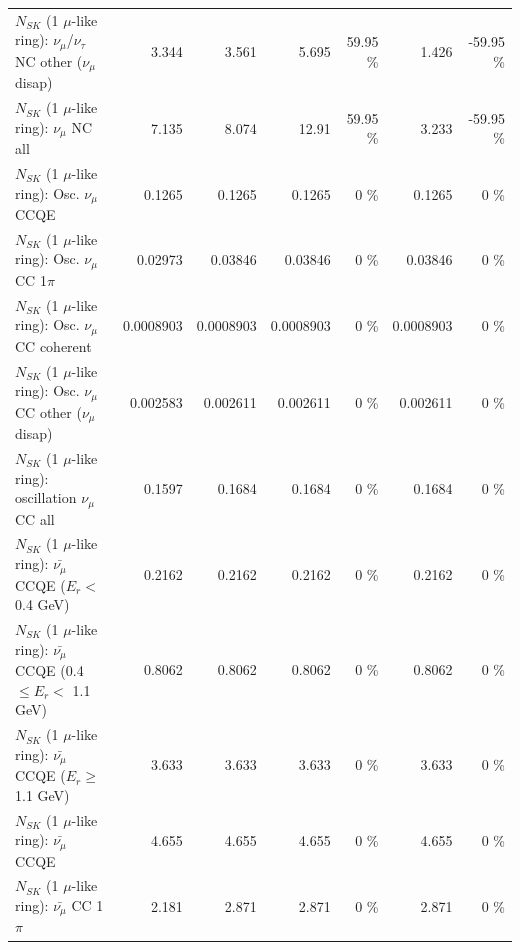 \begin{table}
\begin{tabular}{| l | r | r | r  r | r  r |}
   $N_{SK}$ (1 $\mu$-like ring): $\nu_\mu$/$\nu_\tau$ NC other ($\nu_\mu$ disap) &           3.344 &           3.561 &           5.695 &    59.95 \%  &           1.426 &   -59.95 \%  \\ 
                                $N_{SK}$ (1 $\mu$-like ring): $\nu_{\mu}$ NC all &           7.135 &           8.074 &           12.91 &    59.95 \%  &           3.233 &   -59.95 \%  \\ 
\hline
\hline
                               $N_{SK}$ (1 $\mu$-like ring): Osc. $\nu_\mu$ CCQE &          0.1265 &          0.1265 &          0.1265 &        0 \%  &          0.1265 &        0 \%  \\ 
                          $N_{SK}$ (1 $\mu$-like ring): Osc. $\nu_\mu$ CC 1$\pi$ &         0.02973 &         0.03846 &         0.03846 &        0 \%  &         0.03846 &        0 \%  \\ 
                        $N_{SK}$ (1 $\mu$-like ring): Osc. $\nu_\mu$ CC coherent &       0.0008903 &       0.0008903 &       0.0008903 &        0 \%  &       0.0008903 &        0 \%  \\ 
         $N_{SK}$ (1 $\mu$-like ring): Osc. $\nu_\mu$ CC other ($\nu_\mu$ disap) &        0.002583 &        0.002611 &        0.002611 &        0 \%  &        0.002611 &        0 \%  \\ 
                      $N_{SK}$ (1 $\mu$-like ring): oscillation $\nu_\mu$ CC all &          0.1597 &          0.1684 &          0.1684 &        0 \%  &          0.1684 &        0 \%  \\ 
\hline
\hline
          $N_{SK}$ (1 $\mu$-like ring): $\bar{\nu_\mu}$ CCQE ($E_{r} <$ 0.4 GeV) &          0.2162 &          0.2162 &          0.2162 &        0 \%  &          0.2162 &        0 \%  \\ 
 $N_{SK}$ (1 $\mu$-like ring): $\bar{\nu_\mu}$ CCQE (0.4 $\leq E_{r} <$ 1.1 GeV) &          0.8062 &          0.8062 &          0.8062 &        0 \%  &          0.8062 &        0 \%  \\ 
       $N_{SK}$ (1 $\mu$-like ring): $\bar{\nu_\mu}$ CCQE ($E_{r} \geq$ 1.1 GeV) &           3.633 &           3.633 &           3.633 &        0 \%  &           3.633 &        0 \%  \\ 
\hline
                              $N_{SK}$ (1 $\mu$-like ring): $\bar{\nu_\mu}$ CCQE &           4.655 &           4.655 &           4.655 &        0 \%  &           4.655 &        0 \%  \\ 
                         $N_{SK}$ (1 $\mu$-like ring): $\bar{\nu_\mu}$ CC 1$\pi$ &           2.181 &           2.871 &           2.871 &        0 \%  &           2.871 &        0 \%  \\ 

\end{tabular}
\end{table}
